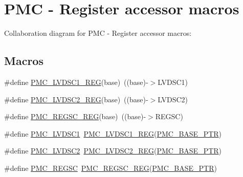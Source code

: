\hypertarget{group___p_m_c___register___accessor___macros}{}\section{P\+MC -\/ Register accessor macros}
\label{group___p_m_c___register___accessor___macros}
Collaboration diagram for P\+MC -\/ Register accessor macros\+:
\subsection*{Macros}
\begin{DoxyCompactItemize}
\item 
\#define \hyperlink{group___p_m_c___register___accessor___macros_gaf6a5650ee275b48943fd2a5f0845be4e}{P\+M\+C\+\_\+\+L\+V\+D\+S\+C1\+\_\+\+R\+EG}(base)~((base)-\/$>$L\+V\+D\+S\+C1)
\item 
\#define \hyperlink{group___p_m_c___register___accessor___macros_ga691e6102ace21a6b54fabd256c5f0d7b}{P\+M\+C\+\_\+\+L\+V\+D\+S\+C2\+\_\+\+R\+EG}(base)~((base)-\/$>$L\+V\+D\+S\+C2)
\item 
\#define \hyperlink{group___p_m_c___register___accessor___macros_ga56808559a3b60498b6604642202faaea}{P\+M\+C\+\_\+\+R\+E\+G\+S\+C\+\_\+\+R\+EG}(base)~((base)-\/$>$R\+E\+G\+SC)
\item 
\#define \hyperlink{group___p_m_c___register___accessor___macros_gae9e90b7b2d3c4f5e0950d074fecb2798}{P\+M\+C\+\_\+\+L\+V\+D\+S\+C1}~\hyperlink{group___p_m_c___register___accessor___macros_gaf6a5650ee275b48943fd2a5f0845be4e}{P\+M\+C\+\_\+\+L\+V\+D\+S\+C1\+\_\+\+R\+EG}(\hyperlink{group___p_m_c___peripheral_gaf32df9f1096263f10a5e8978a338b2ac}{P\+M\+C\+\_\+\+B\+A\+S\+E\+\_\+\+P\+TR})
\item 
\#define \hyperlink{group___p_m_c___register___accessor___macros_ga921b48d20e5bc7e7353ac2f59c8135ba}{P\+M\+C\+\_\+\+L\+V\+D\+S\+C2}~\hyperlink{group___p_m_c___register___accessor___macros_ga691e6102ace21a6b54fabd256c5f0d7b}{P\+M\+C\+\_\+\+L\+V\+D\+S\+C2\+\_\+\+R\+EG}(\hyperlink{group___p_m_c___peripheral_gaf32df9f1096263f10a5e8978a338b2ac}{P\+M\+C\+\_\+\+B\+A\+S\+E\+\_\+\+P\+TR})
\item 
\#define \hyperlink{group___p_m_c___register___accessor___macros_gad80edb8f69da1769b7367108d8c4f9be}{P\+M\+C\+\_\+\+R\+E\+G\+SC}~\hyperlink{group___p_m_c___register___accessor___macros_ga56808559a3b60498b6604642202faaea}{P\+M\+C\+\_\+\+R\+E\+G\+S\+C\+\_\+\+R\+EG}(\hyperlink{group___p_m_c___peripheral_gaf32df9f1096263f10a5e8978a338b2ac}{P\+M\+C\+\_\+\+B\+A\+S\+E\+\_\+\+P\+TR})
\end{DoxyCompactItemize}


